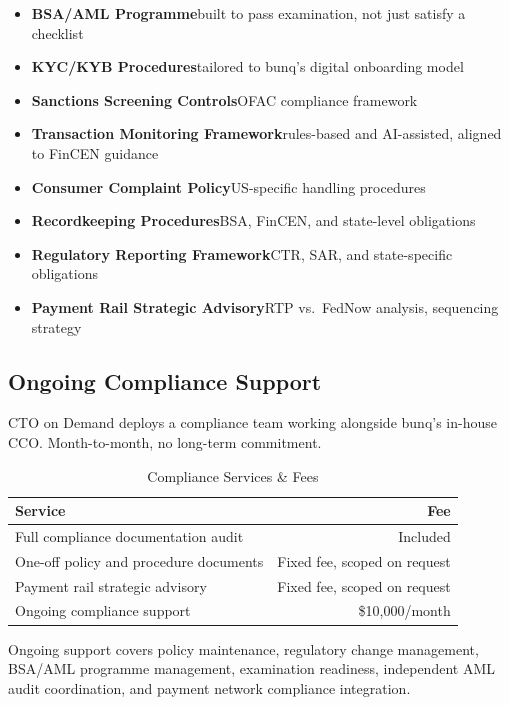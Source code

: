 \begin{itemize}
\item \textbf{BSA/AML Programme}\dash built to pass examination, not just satisfy a checklist
\item \textbf{KYC/KYB Procedures}\dash tailored to bunq's digital onboarding model
\item \textbf{Sanctions Screening Controls}\dash OFAC compliance framework
\item \textbf{Transaction Monitoring Framework}\dash rules-based and AI-assisted, aligned to FinCEN guidance
\item \textbf{Consumer Complaint Policy}\dash US-specific handling procedures
\item \textbf{Recordkeeping Procedures}\dash BSA, FinCEN, and state-level obligations
\item \textbf{Regulatory Reporting Framework}\dash CTR, SAR, and state-specific obligations
\item \textbf{Payment Rail Strategic Advisory}\dash RTP vs.\ FedNow analysis, sequencing strategy
\end{itemize}

\subsection{Ongoing Compliance Support}

CTO on Demand deploys a compliance team working alongside bunq's in-house CCO. Month-to-month, no long-term commitment.

\begin{table}[ht]
\centering
\caption{Compliance Services \& Fees}
\begin{tabularx}{\textwidth}{@{}X r@{}}
\toprule
\textbf{Service} & \textbf{Fee} \\
\midrule
Full compliance documentation audit & Included \\
One-off policy and procedure documents & Fixed fee, scoped on request \\
Payment rail strategic advisory & Fixed fee, scoped on request \\
Ongoing compliance support & \$10,000/month \\
\bottomrule
\end{tabularx}
\end{table}

\noindent Ongoing support covers policy maintenance, regulatory change management, BSA/AML programme management, examination readiness, independent AML audit coordination, and payment network compliance integration.
